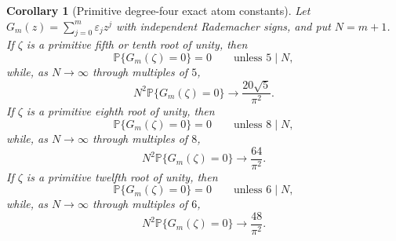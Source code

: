 \documentclass[11pt]{amsart}
\numberwithin{equation}{section}
\newtheorem{corollary}[theorem]{Corollary}
\theoremstyle{definition}
\theoremstyle{remark}
\newcommand{\Prob}{\mathbb P}
\begin{document}
\begin{corollary}[Primitive degree-four exact atom constants]
\label{cor:rademacher-degree-four-atoms}
Let \(G_m(z)=\sum_{j=0}^m\varepsilon_jz^j\) with independent Rademacher signs,
and put \(N=m+1\).  If \(\zeta\) is a primitive fifth or tenth root of unity,
then
\[
  \Prob\{G_m(\zeta)=0\}=0\qquad\text{unless }5\mid N,
\]
while, as \(N\to\infty\) through multiples of \(5\),
\[
  N^2\Prob\{G_m(\zeta)=0\}\longrightarrow \frac{20\sqrt5}{\pi^2}.
\]
If \(\zeta\) is a primitive eighth root of unity, then
\[
  \Prob\{G_m(\zeta)=0\}=0\qquad\text{unless }8\mid N,
\]
while, as \(N\to\infty\) through multiples of \(8\),
\[
  N^2\Prob\{G_m(\zeta)=0\}\longrightarrow \frac{64}{\pi^2}.
\]
If \(\zeta\) is a primitive twelfth root of unity, then
\[
  \Prob\{G_m(\zeta)=0\}=0\qquad\text{unless }6\mid N,
\]
while, as \(N\to\infty\) through multiples of \(6\),
\[
  N^2\Prob\{G_m(\zeta)=0\}\longrightarrow \frac{48}{\pi^2}.
\]
\end{corollary}
\end{document}
